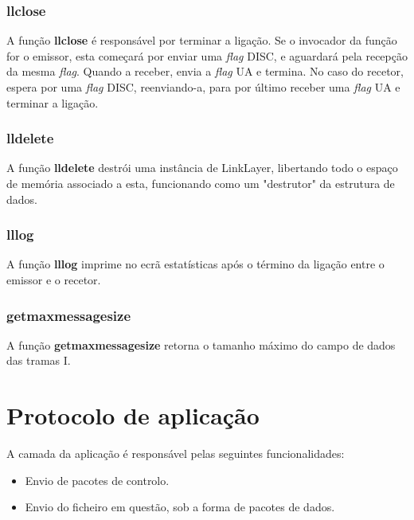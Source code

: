 \documentclass[11pt,a4paper,reqno]{article}
\numberwithin{equation}{section}
\begin{document}
\subsubsection{llclose}

A função \textbf{llclose} é responsável por terminar a ligação. Se o invocador da função for o emissor, esta começará por enviar uma \textit{flag} DISC, e aguardará pela recepção da mesma \textit{flag}. Quando a receber, envia a \textit{flag} UA e termina. No caso do recetor, espera por uma \textit{flag} DISC, reenviando-a, para por último receber uma \textit{flag} UA e terminar a ligação.

\subsubsection{lldelete}

A função \textbf{lldelete} destrói uma instância de LinkLayer, libertando todo o espaço de memória associado a esta, funcionando como um "destrutor" da estrutura de dados.

\subsubsection{lllog}

A função \textbf{lllog} imprime no ecrã estatísticas após o término da ligação entre o emissor e o recetor.

\subsubsection{get\textunderscore max\textunderscore message\textunderscore size}

A função \textbf{get\textunderscore max\textunderscore message\textunderscore size} retorna o tamanho máximo do campo de dados das tramas I.


\section{Protocolo de aplicação}

A camada da aplicação é responsável pelas seguintes funcionalidades:

\begin{itemize}
	\item Envio de pacotes de controlo.
	\item Envio do ficheiro em questão, sob a forma de pacotes de dados.
\end{itemize}
\end{document}
